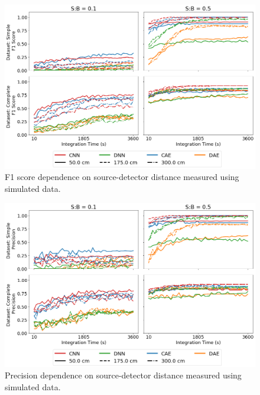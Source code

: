 \begin{figure}[H]
	\centering
	\includegraphics[width=1.0\linewidth]{images/sim-generalization-dist-f1}
	\caption{F1 score dependence on source-detector distance measured using simulated data.}
	\label{fig:sim-generalization-dist-f1}
\end{figure}

\begin{figure}[H]
	\centering
	\includegraphics[width=1.0\linewidth]{images/sim-generalization-dist-precision}
	\caption{Precision dependence on source-detector distance measured using simulated data.}
	\label{fig:sim-generalization-dist-precision}
\end{figure}

